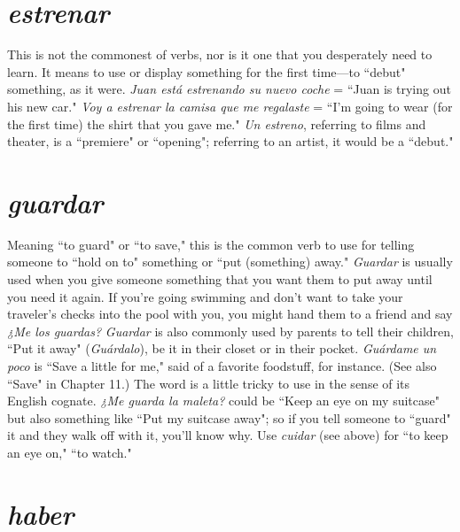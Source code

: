 \section{\emph{estrenar}}

This is not the commonest of verbs, nor is it one that you desperately need to learn. It means to use or display something for the
first time---to ``debut" something, as it were. \emph{Juan está estrenando su
nuevo coche} = ``Juan is trying out his new car." \emph{Voy a estrenar la camisa que me regalaste} = ``I'm going to wear (for the first time) the
shirt that you gave me." \emph{Un estreno}, referring to films and theater, is a
``premiere" or ``opening"; referring to an artist, it would be a ``debut."

\section{\emph{guardar}}

Meaning ``to guard" or ``to save," this is the common verb to
use for telling someone to ``hold on to" something or ``put (something)
away." \emph{Guardar} is usually used when you give someone something
that you want them to put away until you need it again. If you're going
swimming and don't want to take your traveler's checks into the pool
with you, you might hand them to a friend and say \emph{¿Me los guardas?}
\emph{Guardar} is also commonly used by parents to tell their children, ``Put
it away" (\emph{Guárdalo}), be it in their closet or in their pocket. \emph{Guárdame
un poco} is ``Save a little for me," said of a favorite foodstuff, for instance. (See also ``Save" in Chapter 11.) The word is a little tricky to
use in the sense of its English cognate. \emph{¿Me guarda la maleta?} could be
``Keep an eye on my suitcase" but also something like ``Put my suitcase away"; so if you tell someone to ``guard" it and they walk off with
it, you'll know why. Use \emph{cuidar} (see above) for ``to keep an eye on,"
``to watch."

\section{\emph{haber}}

